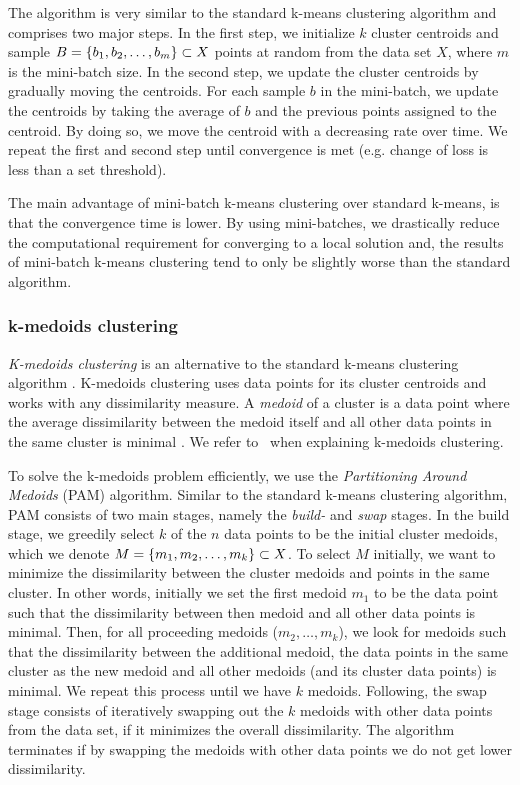The algorithm is very similar to the standard k-means clustering algorithm and comprises two major steps. In the first step, we initialize $k$ cluster centroids and sample $B=\left\{b_1, b_2, \ldots, b_m\right\} \subset X$ points at random from the data set $X$, where $m$ is the mini-batch size. In the second step, we update the cluster centroids by gradually moving the centroids. For each sample $b$ in the mini-batch, we update the centroids by taking the average of $b$ and the previous points assigned to the centroid. By doing so, we move the centroid with a decreasing rate over time. We repeat the first and second step until convergence is met (e.g. change of loss is less than a set threshold).

The main advantage of mini-batch k-means clustering over standard k-means, is that the convergence time is lower. By using mini-batches, we drastically reduce the computational requirement for converging to a local solution and, the results of mini-batch k-means clustering tend to only be slightly worse than the standard algorithm.

\subsubsection{k-medoids clustering}
\label{sec:k-medoids-clustering}
\textit{K-medoids clustering} is an alternative to the standard k-means clustering algorithm \cites{Kaufman1990}[p. 427 - 428]{bishop2006}. K-medoids clustering uses data points for its cluster centroids and works with any dissimilarity measure. A \textit{medoid} of a cluster is a data point where the average dissimilarity between the medoid itself and all other data points in the same cluster is minimal \cite{Kaufman1990}. We refer to \cites{Kaufman1990}[p. 427 - 428]{bishop2006}\, when explaining k-medoids clustering.

To solve the k-medoids problem efficiently, we use the \textit{Partitioning Around Medoids} (PAM) algorithm. Similar to the standard k-means clustering algorithm, PAM consists of two main stages, namely the \textit{build-} and \textit{swap} stages. In the build stage, we greedily select $k$ of the $n$ data points to be the initial cluster medoids, which we denote $M = \left\{m_1, m_2, \ldots, m_k\right\} \subset X$. To select $M$ initially, we want to minimize the dissimilarity between the cluster medoids and points in the same cluster. In other words, initially we set the first medoid $m_1$ to be the data point such that the dissimilarity between then medoid and all other data points is minimal. Then, for all proceeding medoids ($m_2, \ldots, m_k$), we look for medoids such that the dissimilarity between the additional medoid, the data points in the same cluster as the new medoid and all other medoids (and its cluster data points) is minimal. We repeat this process until we have $k$ medoids. Following, the swap stage consists of iteratively swapping out the $k$ medoids with other data points from the data set, if it minimizes the overall dissimilarity. The algorithm terminates if by swapping the medoids with other data points we do not get lower dissimilarity.

